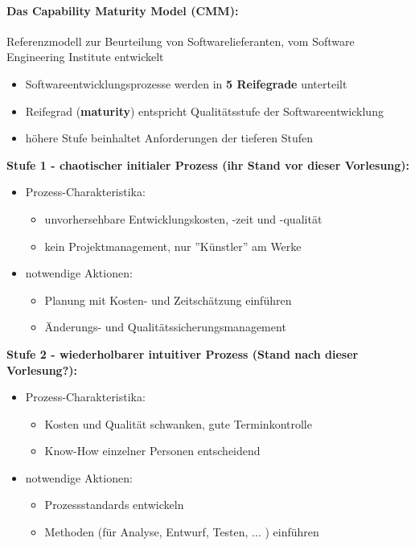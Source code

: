 \paragraph{Das Capability Maturity Model (CMM):}
Referenzmodell zur Beurteilung von Softwarelieferanten, vom Software Engineering Institute entwickelt
\begin{itemize}
	\item Softwareentwicklungsprozesse werden in \textbf{5 Reifegrade} unterteilt
	\item Reifegrad (\textbf{maturity}) entspricht Qualitätsstufe der Softwareentwicklung
	\item höhere Stufe beinhaltet Anforderungen der tieferen Stufen
\end{itemize}

\textbf{Stufe 1 - chaotischer initialer Prozess (ihr Stand vor dieser Vorlesung):}
\begin{itemize}
	\item Prozess-Charakteristika:
	\begin{itemize}
		\item unvorhersehbare Entwicklungskosten, -zeit und -qualität
		\item kein Projektmanagement, nur ''Künstler'' am Werke
	\end{itemize}
	\item notwendige Aktionen:
	\begin{itemize}
		\item Planung mit Kosten- und Zeitschätzung einführen
		\item Änderungs- und Qualitätssicherungsmanagement 
	\end{itemize}
\end{itemize}

\textbf{Stufe 2 - wiederholbarer intuitiver Prozess  (Stand nach dieser Vorlesung?):}
\begin{itemize}
	\item Prozess-Charakteristika:
	\begin{itemize}
		\item Kosten und Qualität schwanken, gute Terminkontrolle
		\item Know-How einzelner Personen entscheidend
	\end{itemize}
	\item notwendige Aktionen:
	\begin{itemize}
		\item Prozessstandards entwickeln
		\item Methoden (für Analyse, Entwurf, Testen, ... ) einführen
	\end{itemize}
\end{itemize}

